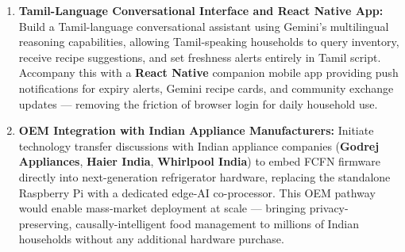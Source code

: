 \documentclass[12pt,a4paper]{report}
\begin{document}
\begin{enumerate}[leftmargin=2em, itemsep=0.3em]
\item \textbf{Tamil-Language Conversational Interface and React Native App:} Build a Tamil-language conversational assistant using Gemini's multilingual reasoning capabilities, allowing Tamil-speaking households to query inventory, receive recipe suggestions, and set freshness alerts entirely in Tamil script. Accompany this with a \textbf{React Native} companion mobile app providing push notifications for expiry alerts, Gemini recipe cards, and community exchange updates — removing the friction of browser login for daily household use.

\item \textbf{OEM Integration with Indian Appliance Manufacturers:} Initiate technology transfer discussions with Indian appliance companies (\textbf{Godrej Appliances}, \textbf{Haier India}, \textbf{Whirlpool India}) to embed FCFN firmware directly into next-generation refrigerator hardware, replacing the standalone Raspberry Pi with a dedicated edge-AI co-processor. This OEM pathway would enable mass-market deployment at scale — bringing privacy-preserving, causally-intelligent food management to millions of Indian households without any additional hardware purchase.

\end{enumerate}
\end{document}
